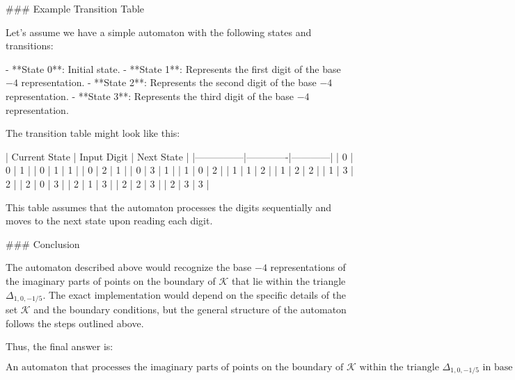 ### Example Transition Table

Let's assume we have a simple automaton with the following states and transitions:

- **State 0**: Initial state.
- **State 1**: Represents the first digit of the base \(-4\) representation.
- **State 2**: Represents the second digit of the base \(-4\) representation.
- **State 3**: Represents the third digit of the base \(-4\) representation.

The transition table might look like this:

| Current State | Input Digit | Next State |
|---------------|-------------|------------|
| 0             | 0           | 1          |
| 0             | 1           | 1          |
| 0             | 2           | 1          |
| 0             | 3           | 1          |
| 1             | 0           | 2          |
| 1             | 1           | 2          |
| 1             | 2           | 2          |
| 1             | 3           | 2          |
| 2             | 0           | 3          |
| 2             | 1           | 3          |
| 2             | 2           | 3          |
| 2             | 3           | 3          |

This table assumes that the automaton processes the digits sequentially and moves to the next state upon reading each digit.

### Conclusion

The automaton described above would recognize the base \(-4\) representations of the imaginary parts of points on the boundary of \(\mathcal{K}\) that lie within the triangle \(\Delta_{1,0,-1/5}\). The exact implementation would depend on the specific details of the set \(\mathcal{K}\) and the boundary conditions, but the general structure of the automaton follows the steps outlined above.

Thus, the final answer is:

\[
\boxed{\text{An automaton that processes the imaginary parts of points on the boundary of } \mathcal{K} \text{ within the triangle } \Delta_{1,0,-1/5} \text{ in base } -4.}
\]
